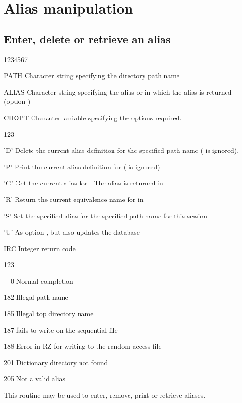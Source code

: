 \section{Alias manipulation}

\subsection{Enter, delete or retrieve an alias}


\begin{DLtt}{1234567}
\item[PATH]Character string specifying the directory path name
\item[ALIAS]Character string specifying the alias or
in which the alias is returned (option )
\item[CHOPT]Character variable specifying the options required.
  \begin{DLtt}{123}
    \item['D']Delete the current alias definition for the specified
      path name ( is ignored).
    \item['P']Print the current alias definition for 
      ( is ignored).
    \item['G']Get the current alias for .
              The alias is returned in .
    \item['R']Return the current equivalence name for  in 
    \item['S']Set the specified alias for the specified path name
              for this session
    \item['U']As option , but also updates the database
  \end{DLtt}
\item[IRC]Integer return code
  \begin{DLtt}{123}
    \item[\ \ 0]Normal completion
    \item[182]Illegal path name
    \item[185]Illegal top directory name
    \item[187] fails to write on the sequential file
    \item[188]Error in RZ for writing to the random access file
    \item[201]Dictionary directory not found
    \item[205]Not a valid alias
  \end{DLtt}
\end{DLtt}
This routine may be used to enter, remove, print or retrieve aliases.

